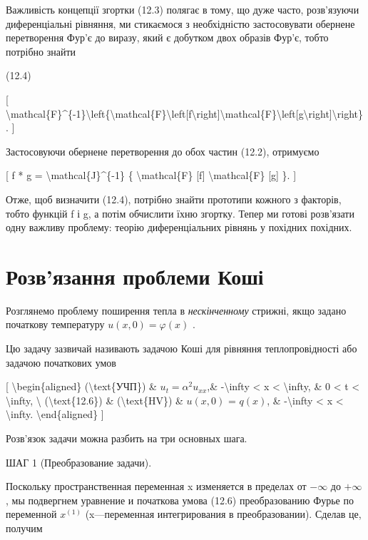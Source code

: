 \documentclass[
]{article}
\begin{document}
{{Важливість концепції згортки (12.3) полягає в тому, що дуже часто,
розв'язуючи диференціальні рівняння, ми стикаємося з необхідністю
застосовувати обернене перетворення Фур'є до виразу, який є добутком
двох образів Фур'є, тобто потрібно знайти

(12.4)

{[}
\textbackslash mathcal\{F\}\^{}\{-1\}\textbackslash left\{\textbackslash mathcal\{F\}\textbackslash left{[}f\textbackslash right{]}\textbackslash mathcal\{F\}\textbackslash left{[}g\textbackslash right{]}\textbackslash right\}.
{]}

Застосовуючи обернене перетворення до обох частин (12.2), отримуємо

{[} f * g = \textbackslash mathcal\{J\}\^{}\{-1\} \{
\textbackslash mathcal\{F\} {[}f{]} \textbackslash mathcal\{F\} {[}g{]}
\}. {]}

Отже, щоб визначити (12.4), потрібно знайти прототипи кожного з
факторів, тобто функцій f і g, а потім обчислити їхню згортку. Тепер ми
готові розв'язати одну важливу проблему: теорію диференціальних рівнянь
у похідних похідних.

\section{Розв'язання проблеми
Коші}\label{ux440ux43eux437ux432ux44fux437ux430ux43dux43dux44f-ux43fux440ux43eux431ux43bux435ux43cux438-ux43aux43eux448ux456}

Розглянемо проблему поширення тепла в \emph{нескінченному} стрижні, якщо
задано початкову температуру \(u(x, 0) = \varphi(x)\) .

Цю задачу зазвичай називають задачою Коші для рівняння теплопровідності
або задачою початкових умов

{[} \textbackslash begin\{aligned\} (\textbackslash text\{УЧП\}) \&
\(u_t = \alpha^2 u_{xx}\),\& -\textbackslash infty \textless{} x
\textless{} \textbackslash infty, \& 0 \textless{} t \textless{}
\textbackslash infty, \textbackslash{} (\textbackslash text\{12.6\}) \&
(\textbackslash text\{HV\}) \& \(u(x,0)\) = \(q(x)\), \&
-\textbackslash infty \textless{} x \textless{} \textbackslash infty.
\textbackslash end\{aligned\} {]}

Розв'язок задачи можна разбить на три основных шага.

ШАГ 1 (Преобразование задачи).

Поскольку пространственная переменная x изменяется в пределах от
\(-\infty\) до \(+\infty\) , мы подвергнем уравнение и початкова умова
(12.6) преобразованию Фурье по переменной \(x^{(1)}\) (x---переменная
интегрирования в преобразовании). Сделав це, получим

}}
\end{document}
